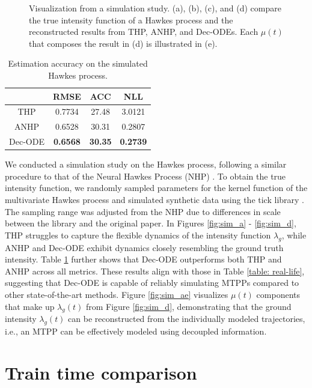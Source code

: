 \begin{figure}[!h]
        \caption{Visualization from a simulation study. (a), (b), (c), and (d) compare the true intensity function of a Hawkes process and the reconstructed results from THP, ANHP, and Dec-ODEs. Each $\mu(t)$ that composes the result in (d) is illustrated in (e).}
        \label{fig:simulation}
    \end{figure}
    
    \begin{table}[h]
        \centering
        \begin{tabular}{c|c|c|c}
                & RMSE   & ACC   & NLL    \\ \hline
        THP     & 0.7734 & 27.48 & 3.0121 \\ 
        ANHP    & 0.6528 & 30.31 & 0.2807 \\ 
        Dec-ODE & \textbf{0.6568} & \textbf{30.35} & \textbf{0.2739} 
        \end{tabular}
        \caption{Estimation accuracy on the simulated Hawkes process. }
            \label{tab:simulation}
        \end{table}

We conducted a simulation study on the Hawkes process, following a similar procedure to that of the Neural Hawkes Process (NHP) \cite{bib:nhp}. 
To obtain the true intensity function, we randomly sampled parameters for the kernel function of the multivariate Hawkes process and simulated synthetic data using the tick library \cite{bacry2018tick}. 
The sampling range was adjusted from the NHP due to differences in scale between the library and the original paper.
In Figures \ref{fig:sim_a} - \ref{fig:sim_d}, THP struggles to capture the flexible dynamics of the intensity function $\lambda_g$, while ANHP and Dec-ODE exhibit dynamics closely resembling the ground truth intensity. 
Table \ref{tab:simulation} further shows that Dec-ODE outperforms both THP and ANHP across all metrics. 
These results align with those in Table \ref{table: real-life}, suggesting that Dec-ODE is capable of reliably simulating MTPPs compared to other state-of-the-art methods. 
Figure \ref{fig:sim_ae} visualizes $\mu(t)$ components that make up $\lambda_g(t)$ from Figure \ref{fig:sim_d}, demonstrating that the ground intensity $\lambda_g(t)$ can be reconstructed from the individually modeled trajectories, i.e., an MTPP can be effectively modeled using decoupled information.


\section{Train time comparison}

